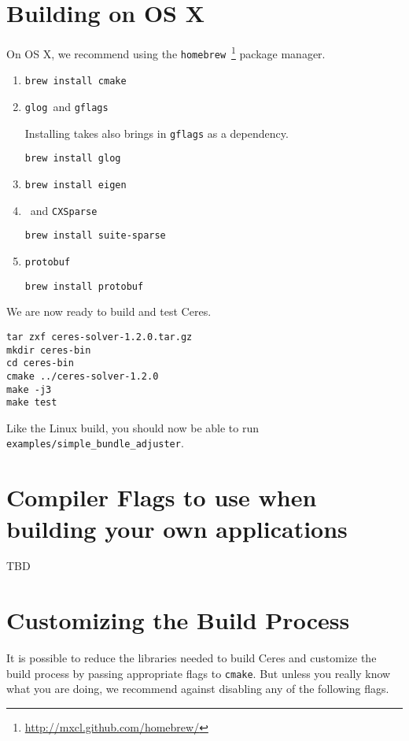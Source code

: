 \section{Building on OS X}
On OS X, we recommend using the \texttt{homebrew}~\footnote{\url{http://mxcl.github.com/homebrew/}} package manager.

\begin{enumerate}
\item{\cmake}
\begin{verbatim}
brew install cmake
\end{verbatim}
\item{\texttt{glog}\ and \texttt{gflags}}

Installing \texttt{\glog} takes also brings in \texttt{gflags} as a dependency.
\begin{verbatim}
brew install glog
\end{verbatim}
\item{\eigen}
\begin{verbatim}
brew install eigen
\end{verbatim}
\item{\suitesparse\ and \texttt{CXSparse}}
\begin{verbatim}
brew install suite-sparse
\end{verbatim}
\item{\texttt{protobuf}}
\begin{verbatim}
brew install protobuf
\end{verbatim}
\end{enumerate}

We are now ready to build and test Ceres.
\begin{verbatim}
tar zxf ceres-solver-1.2.0.tar.gz
mkdir ceres-bin
cd ceres-bin
cmake ../ceres-solver-1.2.0
make -j3
make test
\end{verbatim}
Like the Linux build, you should now be able to run \texttt{examples/simple\_bundle\_adjuster}.


\section{Compiler Flags to use when building your own applications}
\label{sec:compiler-flags}
TBD


\section{Customizing the Build Process}
\label{sec:custom}
It is possible to reduce the libraries needed to build Ceres and
customize the build process by passing appropriate flags to \texttt{cmake}. But unless you really know what you are
doing, we recommend against disabling any of the following flags.

